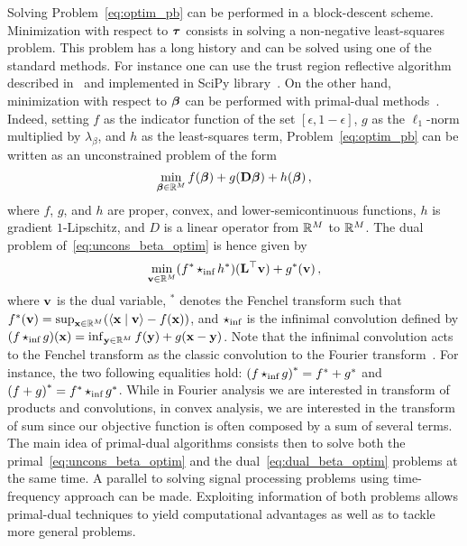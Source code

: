 Solving Problem~\ref{eq:optim_pb} can be performed in a block-descent scheme.
Minimization with respect to $\boldsymbol{\tau}$ consists in solving a non-negative
least-squares problem.
This problem has a long history and can be solved using one of the standard
methods.
For instance one can use the trust region reflective algorithm described
in~\cite{Coleman_T_1996_j-siam-j-optim_interior_tranmsb} and implemented in SciPy
library~\cite{Virtanen_P_2020_j-nat-meth_scipy_fascp}.
On the other hand, minimization with respect to $\boldsymbol{\beta}$ can be performed with
primal-dual methods~\cite{Komodakis_N_2015_j-ieee-sig-proc-mag_playing_d}.
Indeed, setting $f$ as the indicator function of the set $[\epsilon, 1-\epsilon]$, $g$ as
the $\ell_{1}$-norm multiplied by $\lambda_{\beta}$, and $h$ as the least-squares term,
Problem~\ref{eq:optim_pb} can be written as an unconstrained problem of
the form
\begin{equation}
  \label{eq:uncons_beta_optim}
  \min_{\bbeta\in\mathbb{R}^{M}} f(\bbeta) + g(\*D\bbeta) + h(\bbeta) \, ,
\end{equation}
where $f$, $g$, and $h$ are proper, convex, and lower-semicontinuous functions,
$h$ is gradient $1$-Lipschitz, and $D$ is a linear operator from $\mathbb{R}^{M}$ to
$\mathbb{R}^{M}$.
The dual problem of~\eqref{eq:uncons_beta_optim} is hence given by
\begin{equation}
  \label{eq:dual_beta_optim}
  \min_{\*v\in\mathbb{R}^{M}} (f^{*} \iconv h^{*})(\*L^{\top}\*v) + g^{*}(\*v) \, ,
\end{equation}
where $\mathbf{v}$ is the dual variable, ${}^{*}$ denotes the Fenchel transform such
that $f^{*}(\mathbf{v})=\sup_{\mathbf{x}\in\mathbb{R}^{M}}(\left\langle\mathbf{x}\;\middle|\;\mathbf{v}\right\rangle-f(\mathbf{x}))$, and
$\operatorname{\mathbin{\star_{\text{inf}}}}$ is the infinimal convolution defined by
$(f \operatorname{\mathbin{\star_{\text{inf}}}} g)(\mathbf{x}) = \inf_{\mathbf{y}\in\mathbb{R}^{M}} f(\mathbf{y}) + g(\mathbf{x}-\mathbf{y})$.
Note that the infinimal convolution acts to the Fenchel transform as the classic
convolution to the Fourier transform~\cite{Komodakis_N_2015_j-ieee-sig-proc-mag_playing_d}.
For instance, the two following equalities hold:
${(f \operatorname{\mathbin{\star_{\text{inf}}}} g)}^{*} = f^{*} + g^{*}$ and ${(f+g)}^{*} = f^{*} \operatorname{\mathbin{\star_{\text{inf}}}} g^{*}$.
While in Fourier analysis we are interested in transform of products and
convolutions, in convex analysis, we are interested in the transform of sum
since our objective function is often composed by a sum of several terms.
The main idea of primal-dual algorithms consists then to solve both the
primal~\eqref{eq:uncons_beta_optim} and the dual~\eqref{eq:dual_beta_optim}
problems at the same time.
A parallel to solving signal processing problems using time-frequency approach
can be made.
Exploiting information of both problems allows primal-dual techniques to yield
computational advantages as well as to tackle more general problems.

